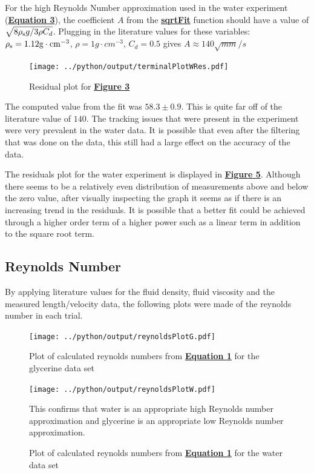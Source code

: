 \documentclass[
	letterpaper
	12pt
]{template}
\newcommand{\bref}[2]{\textbf{\hyperref[#1]{#2}}}
\begin{document}
For the high Reynolds Number approximation used in the water experiment (\bref{eqn::terminalVelocity}{Equation 3}), the coefficient $A$ from the \bref{fnc::sqrtFit}{sqrtFit} function should have a value of $\sqrt{8\rho_{\rm s} g/ 3\rho C_d  }$. Plugging in the literature values for these variables: $\rho_{\rm s} = 1.12\unit{g \cdot cm^{-3}}$, $\rho = 1\unit{g \cdot cm^{-3}}$, $C_d = 0.5$ \cite{labManual} gives $A\approx  140\unit{\sqrt{mm}\per s}$

\begin{figure}\label{fig::terminalPlotWRes}
	\vspace{-10pt}
	\centering
	\texttt{[image: ../python/output/terminalPlotWRes.pdf]}
	\caption{Residual plot for \bref{fig::terminalPlotW}{Figure 3}}
	\vspace{-20pt}
\end{figure}

The computed value from the fit was $58.3\pm 0.9$. This is quite far off of the literature value of $140$. The tracking issues that were present in the experiment were very prevalent in the water data. It is possible that even after the filtering that was done on the data, this still had a large effect on the accuracy of the data. \vspace{\baselineskip}

The residuals plot for the water experiment is displayed in \bref{fig::terminalPlotWRes}{Figure 5}. Although there seems to be a relatively even distribution of measurements above and below the zero value, after visually inspecting the graph it seems as if there is an increasing trend in the residuals. It is possible that a better fit could be achieved through a higher order term of a higher power such as a linear term in addition to the square root term.\vspace{\baselineskip}

\subsection{Reynolds Number}
By applying literature values for the fluid density, fluid viscosity and the measured length/velocity data, the following plots were made of the reynolds number in each trial.
\begin{figure}[H]
	\begin{minipage}[t]{0.4\textwidth}
		\texttt{[image: ../python/output/reynoldsPlotG.pdf]}
		\caption{Plot of calculated reynolds numbers from \bref{eqn::reynolds}{Equation 1} for the glycerine data set}
	\end{minipage}
	\hfill
	\begin{minipage}[t]{0.4\textwidth}
		\texttt{[image: ../python/output/reynoldsPlotW.pdf]}
		\caption{Plot of calculated reynolds numbers from \bref{eqn::reynolds}{Equation 1} for the water data set}
	\end{minipage}\vspace{\baselineskip}

	This confirms that water is an appropriate high Reynolds number approximation and glycerine is an appropriate low Reynolds number approximation.
\end{figure}
\end{document}
